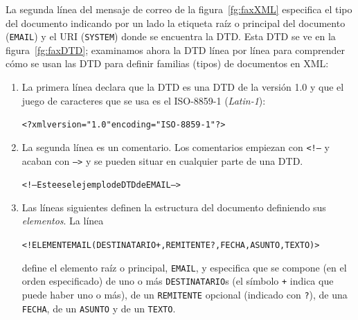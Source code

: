 La segunda línea del mensaje de correo de la figura~\ref{fg:faxXML} especifica el tipo del documento indicando por un lado la etiqueta raíz o principal del documento (\texttt{EMAIL}) y el URI (\texttt{SYSTEM}) donde se encuentra la DTD. Esta DTD se ve en la figura~\ref{fg:faxDTD}; examinamos ahora la DTD línea por línea para comprender cómo se usan las DTD para definir familias (tipos) de documentos en XML: \begin{enumerate} \item La primera línea declara que la DTD es una DTD de la versión 1.0 y que el juego de caracteres que se usa es el ISO-8859-1 (\emph{Latin-1}): \begin{small}\begin{alltt} <?xml version="1.0" encoding="ISO-8859-1"?> \end{alltt}\end{small} 

\item La segunda línea es un comentario. Los comentarios empiezan con \texttt{<!--} y acaban con \texttt{-->} y se pueden situar en cualquier parte de una DTD. \begin{small}\begin{alltt} <!-- Este es el ejemplo de DTD de EMAIL --> \end{alltt}\end{small} 

\item Las líneas siguientes definen la estructura del documento definiendo sus \emph{elementos}. La línea \begin{small}\begin{alltt} <!ELEMENT EMAIL (DESTINATARIO+, REMITENTE?, FECHA, ASUNTO, TEXTO)> \end{alltt}\end{small} define el elemento raíz o principal, \texttt{EMAIL}, y especifica que se compone (en el orden especificado) de uno o más \texttt{DESTINATARIO}s (el símbolo \texttt{+} indica que puede haber uno o más), de un \texttt{REMITENTE} opcional (indicado con \texttt{?}), de una  \texttt{FECHA}, de un \texttt{ASUNTO} y de un \texttt{TEXTO}. 


\end{enumerate}
